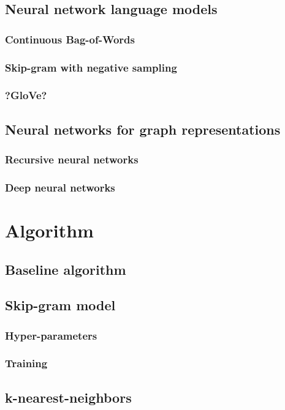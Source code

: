 \documentclass[11pt]{scrartcl} %
\theoremstyle{definition}
\begin{document}
\subsection{Neural network language models}
\subsubsection{Continuous Bag-of-Words}
\subsubsection{Skip-gram with negative sampling}
\subsubsection{?GloVe?}

\subsection{Neural networks for graph representations}
\subsubsection{Recursive neural networks}
\subsubsection{Deep neural networks}

\section{Algorithm}

\subsection{Baseline algorithm}

\subsection{Skip-gram model}

\subsubsection{Hyper-parameters}
\subsubsection{Training}


\subsection{k-nearest-neighbors}
\end{document}
